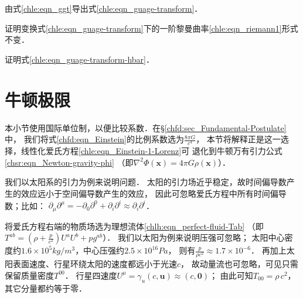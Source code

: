\begin{exercise}
	由式\eqref{chle:eqn_ggt}导出式\eqref{chle:eqn_guage-transform}．
\end{exercise}

\begin{exercise}
	证明变换式\eqref{chle:eqn_guage-transform}下的一阶黎曼曲率\eqref{chle:eqn_riemann1}形式不变．
\end{exercise}

\begin{exercise}
	证明式\eqref{chle:eqn_guage-transform-hbar}．
\end{exercise}


\section{牛顿极限}\label{chle:sec_Newton-limit}
本小节使用国际单位制，以便比较系数．在\S\ref{chfd:sec_Fundamental-Postulate}中，
我们将式\eqref{chfd:eqn_Einstein}的比例系数选为$\frac{8\pi G}{c^4}$，
本节将解释正是这一选择，线性化爱氏方程\eqref{chle:eqn_Einstein-1-Lorenz}可
退化到牛顿万有引力公式\eqref{chsr:eqn_Newton-gravity-phi}
（即$\nabla ^2 \Phi(\boldsymbol{x}) = 4 \pi G \rho(\boldsymbol{x})$）．


我们以太阳系的引力为例来说明问题．
太阳的引力场近乎稳定，故时间偏导数产生的效应远小于空间偏导数产生的效应，
因此可忽略爱氏方程中所有时间偏导数；比如：
$\partial_\mu\partial^\mu=-\partial_0\partial^0+\partial_i\partial^i
    \approx \partial_i\partial^i $．
    
将爱氏方程右端的物质场选为理想流体\eqref{chlh:eqn_perfect-fluid-Tab}
（即$T^{ab}=\left(\rho  + \frac{p}{c^2}  \right) U^a U^b +p g^{ab} $）．
我们以太阳为例来说明压强可忽略；
太阳中心密度约$1.6\times 10^{5} kg/m^3 $，中心压强约$2.5\times 10^{16}Pa$，
则有$  \frac{p}{\rho c^2 } \approx 1.7 \times 10^{-6} $．
再加上太阳表面速度、行星环绕太阳的速度都远小于光速$c$，
故动量流也可忽略，可见只需保留质量密度$T^{00}$．
行星四速度$U^\mu = \gamma_u (c,\boldsymbol{u}) \approx (c,\boldsymbol{0})$；
由此可知$T_{00}=\rho \, c^2$，其它分量都约等于零．

